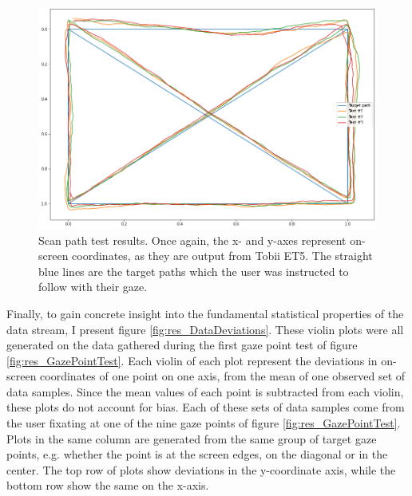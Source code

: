 \begin{figure}[h]
    \centering
    \includegraphics[width=\textwidth]{Images/DataQuality/ScanpathTest.png}
    \caption{Scan path test results. Once again, the x- and y-axes represent on-screen coordinates, as they are output from Tobii ET5. The straight blue lines are the target paths which the user was instructed to follow with their gaze. }
    \label{fig:res_ScanpathTest}
\end{figure}

Finally, to gain concrete insight into the fundamental statistical properties of the data stream, I present figure \ref{fig:res_DataDeviations}. These violin plots were all generated on the data gathered during the first gaze point test of figure \ref{fig:res_GazePointTest}. Each violin of each plot represent the deviations in on-screen coordinates of one point on one axis, from the mean of one observed set of data samples. Since the mean values of each point is subtracted from each violin, these plots do not account for bias. Each of these sets of data samples come from the user fixating at one of the nine gaze points of figure \ref{fig:res_GazePointTest}. Plots in the same column are generated from the same group of target gaze points, e.g. whether the point is at the screen edges, on the diagonal or in the center. The top row of plots show deviations in the y-coordinate axis, while the bottom row show the same on the x-axis.

